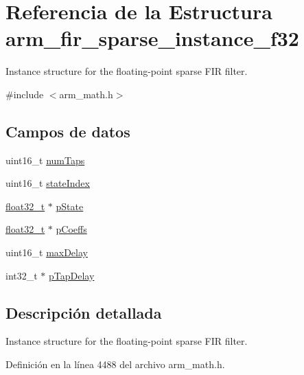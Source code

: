 \hypertarget{structarm__fir__sparse__instance__f32}{}\section{Referencia de la Estructura arm\+\_\+fir\+\_\+sparse\+\_\+instance\+\_\+f32}
\label{structarm__fir__sparse__instance__f32}


Instance structure for the floating-\/point sparse F\+IR filter.  




{\ttfamily \#include $<$arm\+\_\+math.\+h$>$}

\subsection*{Campos de datos}
\begin{DoxyCompactItemize}
\item 
uint16\+\_\+t \hyperlink{structarm__fir__sparse__instance__f32_a751941891e47f522a7f5375fe8990aac}{num\+Taps}
\item 
uint16\+\_\+t \hyperlink{structarm__fir__sparse__instance__f32_a566a0cb53437e48b9a3bf18e5b03d8aa}{state\+Index}
\item 
\hyperlink{arm__math_8h_a4611b605e45ab401f02cab15c5e38715}{float32\+\_\+t} $\ast$ \hyperlink{structarm__fir__sparse__instance__f32_a335c87e6fdc4b96601d95a5de8b9c463}{p\+State}
\item 
\hyperlink{arm__math_8h_a4611b605e45ab401f02cab15c5e38715}{float32\+\_\+t} $\ast$ \hyperlink{structarm__fir__sparse__instance__f32_aacbb8dd8eeba4b21fc2bb40076405ee3}{p\+Coeffs}
\item 
uint16\+\_\+t \hyperlink{structarm__fir__sparse__instance__f32_ab25f4ee7550e6d92acff77ada283733f}{max\+Delay}
\item 
int32\+\_\+t $\ast$ \hyperlink{structarm__fir__sparse__instance__f32_adec00b3793ab4f08edfeb4ea6a9eb6e6}{p\+Tap\+Delay}
\end{DoxyCompactItemize}


\subsection{Descripción detallada}
Instance structure for the floating-\/point sparse F\+IR filter. 

Definición en la línea 4488 del archivo arm\+\_\+math.\+h.



